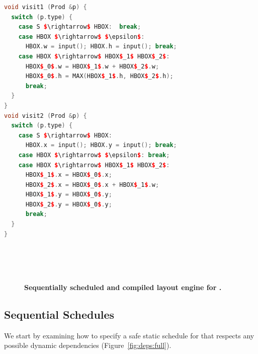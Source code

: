 \newsavebox{\hboxvisitors}
\begin{lrbox}{\hboxvisitors}%
\begin{minipage}{1\columnwidth}
\begin{lstlisting}[mathescape,language=C++]
void visit1 (Prod &p) {
  switch (p.type) {
    case S $\rightarrow$ HBOX:  break;
    case HBOX $\rightarrow$ $\epsilon$:
      HBOX.w = input(); HBOX.h = input(); break;
    case HBOX $\rightarrow$ HBOX$_1$ HBOX$_2$:
      HBOX$_0$.w = HBOX$_1$.w + HBOX$_2$.w;
      HBOX$_0$.h = MAX(HBOX$_1$.h, HBOX$_2$.h);
      break;
  }
}
void visit2 (Prod &p) {
  switch (p.type) {
    case S $\rightarrow$ HBOX:
      HBOX.x = input(); HBOX.y = input(); break;
    case HBOX $\rightarrow$ $\epsilon$: break;
    case HBOX $\rightarrow$ HBOX$_1$ HBOX$_2$:
      HBOX$_1$.x = HBOX$_0$.x;
      HBOX$_2$.x = HBOX$_0$.x + HBOX$_1$.w;
      HBOX$_1$.y = HBOX$_0$.y;
      HBOX$_2$.y = HBOX$_0$.y;
      break;
  }
}
\end{lstlisting}
\end{minipage}
\end{lrbox}




\begin{figure}
 \\
 \\
 \\
\caption{\textbf{Sequentially scheduled and compiled layout engine for \hlang{}.}}
\label{fig:hboxseq}
\end{figure}





\subsection{Sequential Schedules}  
We start by examining how to specify a safe static schedule for \hlang that respects any possible dynamic dependencies (Figure~\ref{fig:deps:full}).

